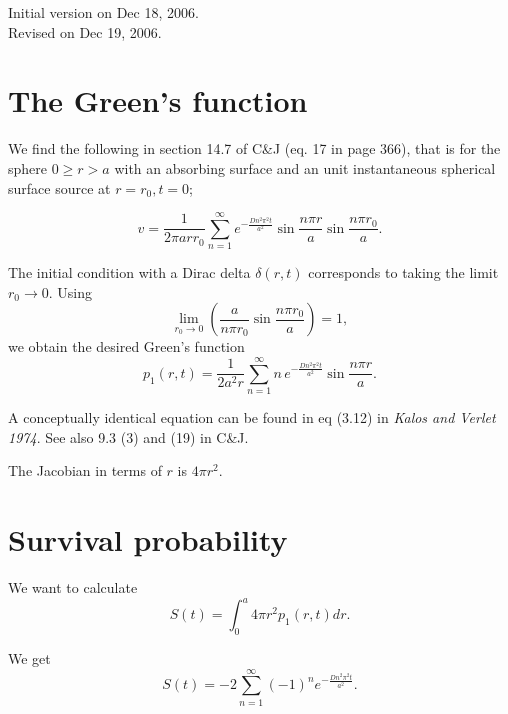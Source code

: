 \documentclass{article}
\begin{document}
\maketitle
\begin{center}
Initial version on Dec 18, 2006.\\
Revised on Dec 19, 2006.
\end{center}

\section{The Green's function}

We find the following in section 14.7 of C\&J (eq. 17 in page 366),
that is for the sphere $0 \geq r > a$ with an absorbing surface
and an unit instantaneous spherical surface source at $r = r_0, t = 0$;

\begin{equation}
v = \frac{1}{2 \pi a r r_0} \sum_{n=1}^{\infty} e^{- \frac{D n^2 \pi^2 t}{a^2} }
\sin \frac{n \pi r}{a} \sin \frac{n \pi r_0}{a}.
\end{equation}

The initial condition with a Dirac delta $\delta(r,t)$ corresponds
to taking the limit $r_0 \rightarrow 0$.  Using
\begin{equation}
\lim_{r_0 \rightarrow 0} 
\left( \frac{a}{n \pi r_0} \sin \frac{n \pi r_0}{a}\right) = 1,
\end{equation}
we obtain the desired Green's function
\begin{equation}
p_1(r,t) = 
\frac{1}{2 a^2 r} \sum_{n=1}^{\infty} n \, e^{- \frac{D n^2 \pi^2 t}{a^2} }
\sin \frac{n \pi r}{a}.
\end{equation}

A conceptually identical equation can be found in eq (3.12) in
{\it Kalos and Verlet 1974}.    See also 9.3 (3) and (19) in C\&J.

The Jacobian in terms of $r$ is $4 \pi r^2$.

\section{Survival probability}

We want to calculate
\begin{equation}
S(t) = \int_{0}^{a} 4 \pi r^2 p_1(r,t) dr.
\end{equation}

We get
\begin{equation}
S(t) = -2 \sum_{n=1}^{\infty} (-1)^n e^{- \frac{D n^2 \pi^2 t}{a^2}}.
\end{equation}
\end{document}
